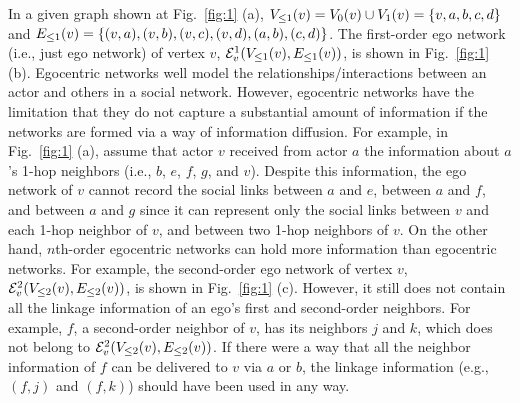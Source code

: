 In a given graph shown at Fig.~\ref{fig:1} (a), $\LV{v}{1} = \V{v}{0} \cup \V{v}{1} = \{v, a, b, c, d\}$ and $\LE{v}{1}=\{(v, a), (v, b), (v, c), (v, d), (a, b), (c, d) \}$. The first-order ego network (i.e., just ego network) of vertex $v$, $\ENN{v}{1}(\LV{v}{1}, \LE{v}{1})$, is shown in Fig.~\ref{fig:1} (b).
Egocentric networks well model the relationships/interactions between an actor and others in a social network.
However, egocentric networks have the limitation that they do not capture a substantial amount of information if the networks are formed via a way of information diffusion.
For example, in Fig.~\ref{fig:1} (a), assume that actor $v$ received from actor $a$ the information about $a$'s 1-hop neighbors (i.e., $b$, $e$, $f$, $g$, and $v$).
Despite this information, the ego network of $v$ cannot record the social links between $a$ and $e$, between $a$ and $f$, and between $a$ and $g$ since it can represent only the social links between $v$ and each 1-hop neighbor of $v$, and between two 1-hop neighbors of $v$.
On the other hand, $n$th-order egocentric networks can hold more information than egocentric networks.
For example, the second-order ego network of vertex $v$, $\ENN{v}{2} (\LV{v}{2}, \LE{v}{2})$, is shown in Fig.~\ref{fig:1} (c).
However, it still does not contain all the linkage information of an ego's first and second-order neighbors.
For example, $f$, a second-order neighbor of $v$, has its neighbors $j$ and $k$, which does not belong to $\ENN{v}{2} (\LV{v}{2}, \LE{v}{2})$. 
If there were a way that all the neighbor information of $f$ can be delivered to $v$ via $a$ or $b$, the linkage information (e.g., $(f, j)$ and $(f, k)$) should have been used in any way. 

